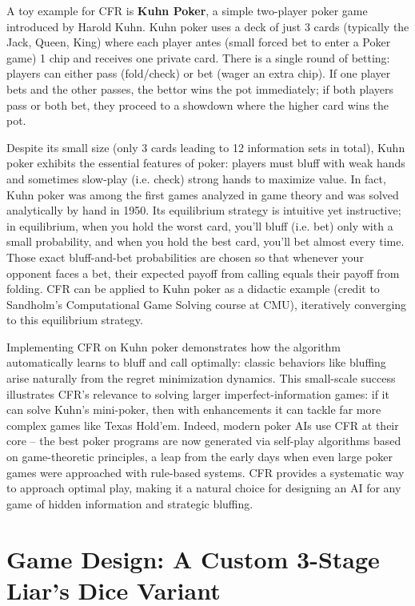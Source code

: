 \documentclass[
]{article}
\begin{document}
A toy example for CFR is \textbf{Kuhn Poker}, a simple two-player poker
game introduced by Harold Kuhn. Kuhn poker uses a deck of just 3 cards
(typically the Jack, Queen, King) where each player antes (small forced
bet to enter a Poker game) 1 chip and receives one private card. There
is a single round of betting: players can either pass (fold/check) or
bet (wager an extra chip). If one player bets and the other passes, the
bettor wins the pot immediately; if both players pass or both bet, they
proceed to a showdown where the higher card wins the pot.

Despite its small size (only 3 cards leading to 12 information sets in
total), Kuhn poker exhibits the essential features of poker: players
must bluff with weak hands and sometimes slow-play (i.e. check) strong
hands to maximize value. In fact, Kuhn poker was among the first games
analyzed in game theory and was solved analytically by hand in 1950. Its
equilibrium strategy is intuitive yet instructive; in equilibrium, when
you hold the worst card, you'll bluff (i.e. bet) only with a small
probability, and when you hold the best card, you'll bet almost every
time. Those exact bluff-and-bet probabilities are chosen so that
whenever your opponent faces a bet, their expected payoff from calling
equals their payoff from folding. CFR can be applied to Kuhn poker as a
didactic example (credit to Sandholm's Computational Game Solving course
at CMU), iteratively converging to this equilibrium strategy.

Implementing CFR on Kuhn poker demonstrates how the algorithm
automatically learns to bluff and call optimally: classic behaviors like
bluffing arise naturally from the regret minimization dynamics. This
small-scale success illustrates CFR's relevance to solving larger
imperfect-information games: if it can solve Kuhn's mini-poker, then
with enhancements it can tackle far more complex games like Texas
Hold'em. Indeed, modern poker AIs use CFR at their core -- the best
poker programs are now generated via self-play algorithms based on
game-theoretic principles, a leap from the early days when even large
poker games were approached with rule-based systems. CFR provides a
systematic way to approach optimal play, making it a natural choice for
designing an AI for any game of hidden information and strategic
bluffing.

\section*{\texorpdfstring{\textbf{Game Design: A Custom 3-Stage Liar's
Dice
Variant}}{Game Design: A Custom 3-Stage Liar's Dice Variant}}\label{game-design-a-custom-3-stage-liars-dice-variant}
\end{document}
